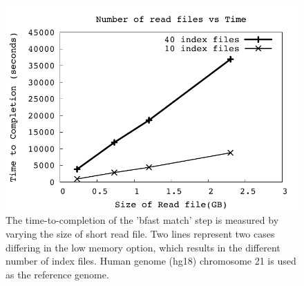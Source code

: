 \documentclass{acm_proc_article-sp}
\begin{document}
\begin{figure}
 \centering
\includegraphics[scale=0.66]{figures/readsvstime.pdf}

\caption{\small The time-to-completion of the 'bfast match' step is
  measured by varying the size of short read file.  Two lines
  represent two cases differing in the low memory option, which
  results in the different number of index files.  Human genome (hg18)
  chromosome 21 is used as the reference genome. }
  \label{fig:parallel-execution} 
 \end{figure}
\end{document}
